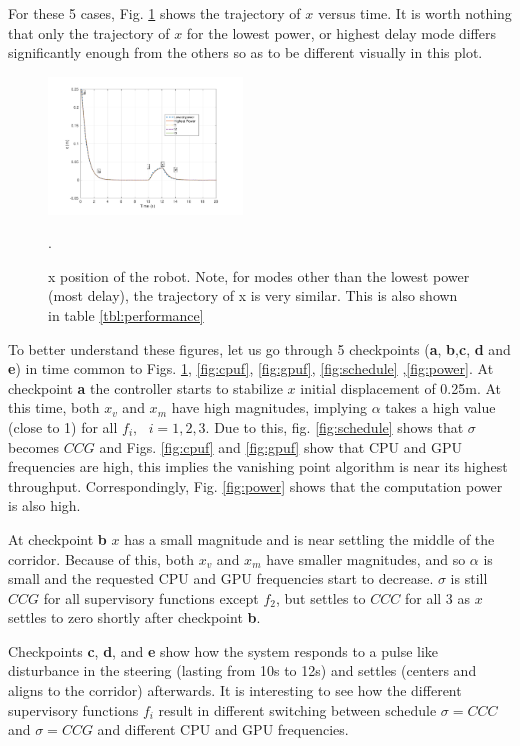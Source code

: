 For these 5 cases, Fig. \ref{fig:xvst} shows the trajectory of $x$ versus time.  It is worth nothing that only the trajectory of $x$ for the lowest power, or highest delay mode differs significantly enough from the others so as to be different visually in this plot.


\begin{figure}[hbtp]
\centering
\includegraphics[width=0.46\textwidth]{../simulations/figs/xvst.pdf}
\caption{x position of the robot. Note, for modes other than the lowest power (most delay), the trajectory of x is very similar. This is also shown in table \ref{tbl:performance}}.
\label{fig:xvst} 
\end{figure}



To better understand these figures, let us go through 5 checkpoints (\textbf{a}, \textbf{b},\textbf{c}, \textbf{d} and \textbf{e}) in time common to Figs. \ref{fig:xvst}, \ref{fig:cpuf}, \ref{fig:gpuf}, \ref{fig:schedule} ,\ref{fig:power}.
At checkpoint \textbf{a} the controller starts to stabilize $x$ initial displacement of 0.25m. At this time, both $x_v$ and $x_m$ have high magnitudes, implying $\alpha$ takes a high value (close to 1) for all $f_i,\text{ }i=1,2,3$. Due to this, fig. \ref{fig:schedule} shows that $\sigma$ becomes $CCG$ and Figs. \ref{fig:cpuf} and \ref{fig:gpuf} show that CPU and GPU frequencies are high, this implies the vanishing point algorithm is near its highest throughput. Correspondingly, Fig. \ref{fig:power} shows that the computation power is also high.

At checkpoint \textbf{b} $x$ has a small magnitude and is near settling the middle of the corridor. Because of this, both $x_v$ and $x_m$ have smaller magnitudes, and so $\alpha$ is small and the requested CPU and GPU frequencies start to decrease. $\sigma$ is still $CCG$ for all supervisory functions except $f_2$, but settles to $CCC$ for all 3 as $x$ settles to zero shortly after checkpoint \textbf{b}.

Checkpoints \textbf{c}, \textbf{d}, and \textbf{e} show how the system responds to a pulse like disturbance in the steering (lasting from 10s to 12s) and settles (centers and aligns to the corridor) afterwards. It is interesting to see how the different supervisory functions $f_i$ result in different switching between schedule $\sigma=CCC$ and $\sigma=CCG$ and different CPU and GPU frequencies.




